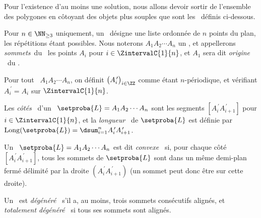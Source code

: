 Pour l'existence d'au moins une solution, nous allons devoir sortir de l'ensemble des polygones en côtoyant des objets plus souples que sont les \ncycles\ définis ci-dessous.




\begin{defi}
	Pour $n \in \NN_{\geq3}$ uniquement, un \og \emph{\ncycle} \fg\ désigne une liste ordonnée de $n$ points du plan, les répétitions étant possibles.
	Nous noterons $A_1 A_2 \cdots A_n$ un \ncycle, 
	et appellerons 
	\og \emph{sommets}\fg\ du \ncycle\ les points $A_i$ pour $i \in \ZintervalC{1}{n}$,
	et $A_1$ sera dit \og \emph{origine} \fg\ du \ncycle.
\end{defi}


\begin{defi}
    Pour tout \ncycle\ $A_1 A_2 \cdots A_n$, on définit $\big( A^{\,\prime}_i \big)_{i \in \ZZ}$ comme étant $n$-périodique, et vérifiant $A^{\,\prime}_{i} = A_i$ sur $\ZintervalC{1}{n}$.
\end{defi}


\begin{defi}
	Les \og \emph{côtés} \fg\ d'un \ncycle\ $\setproba{L} = A_1 A_2 \cdots A_n$ sont les segments
	$[A^{\,\prime}_i A^{\,\prime}_{i+1}]$ pour $i \in \ZintervalC{1}{n}$,
	et
	la \og \emph{longueur} \fg\ de $\setproba{L}$ est définie par $\cyclelen{\setproba{L}} = \dsum_{i=1}^{n} A^{\,\prime}_i A^{\,\prime}_{i+1}$.
\end{defi}


\begin{defi}
	Un \ncycle\ $\setproba{L} = A_1 A_2 \cdots A_n$ est dit \og \emph{convexe} \fg\ si, pour chaque côté $[A^{\,\prime}_i A^{\,\prime}_{i+1}]$, tous les sommets de $\setproba{L}$ sont dans un même demi-plan fermé délimité par la droite $(A^{\,\prime}_i A^{\,\prime}_{i+1})$ (un sommet peut donc être sur cette droite).
\end{defi}


\begin{defi}
	Un \ncycle\ est \og \emph{dégénéré} \fg\ s'il a, au moins, trois sommets consécutifs alignés,
	et
	\og \emph{totalement dégénéré} \fg\ si tous ses sommets sont alignés.
\end{defi}


